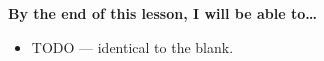 \documentclass[10pt]{article}
\newcommand{\vocabans}[2]{%
  \par\noindent\textbf{\textcolor{forest}{#1:}}\\[1pt]\ansline{#2}\par}
\begin{document}

\vspace{0.10in}

\begin{objectivebox}
\textbf{By the end of this lesson, I will be able to\dots}
\begin{itemize}\setlength{\itemsep}{2pt}
  \item TODO --- identical to the blank.
\end{itemize}
\end{objectivebox}
\end{document}
